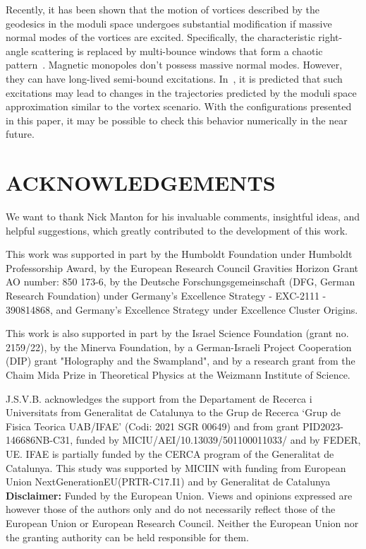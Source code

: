 \documentclass[aps, prd, twocolumn, superscriptaddress, preprintnumbers, nofootinbib, longbibliography]{revtex4-1}
\begin{document}
Recently, it has been shown that the motion of vortices described by the geodesics in the moduli space undergoes substantial modification if massive normal modes of the vortices are excited. Specifically, the characteristic right-angle scattering is replaced by multi-bounce windows that form a chaotic pattern~\cite{AlonsoIzquierdo:2024nbn, Krusch:2024vuy}.
Magnetic monopoles don't possess massive normal modes. However, they can have long-lived semi-bound excitations. In~\cite{GarciaMartin-Caro:2025zkc}, it is predicted that such excitations may lead to changes in the trajectories predicted by the moduli space approximation similar to the vortex scenario. With the configurations presented in this paper, it may be possible to check this behavior numerically in the near future.


\section*{\MakeUppercase{Acknowledgements}}
We want to thank Nick Manton for his invaluable comments, insightful ideas, and helpful suggestions, which greatly contributed to the development of this work.

This work was supported in part by the Humboldt Foundation under Humboldt Professorship Award, 
by the European Research Council Gravities Horizon Grant AO number: 850 173-6,  by the Deutsche Forschungsgemeinschaft (DFG, German Research Foundation) under Germany's Excellence Strategy - EXC-2111 - 390814868, and Germany's Excellence Strategy under Excellence Cluster Origins.

This work is also supported in part by the Israel Science Foundation (grant no. 2159/22), by the Minerva Foundation, by a German-Israeli Project Cooperation (DIP) grant "Holography and the Swampland", and by a research grant from the Chaim Mida Prize in Theoretical Physics at the Weizmann Institute of Science.

J.S.V.B. acknowledges the support from the Departament de Recerca i Universitats from Generalitat de Catalunya to the Grup de Recerca ‘Grup de Fisica Teorica UAB/IFAE’ (Codi: 2021 SGR 00649) and from grant PID2023-146686NB-C31, funded by MICIU/AEI/10.13039/501100011033/ and by FEDER, UE. IFAE is partially funded by the CERCA program of the Generalitat de Catalunya. This study was supported by MICIIN with funding from European Union NextGenerationEU(PRTR-C17.I1) and by Generalitat de Catalunya
\\[0.2cm]
\noindent\textbf{Disclaimer:}
Funded by the European Union. Views and opinions expressed are however those of the authors only and do not necessarily reflect those of the European Union or European Research Council. Neither the European Union nor the granting authority can be held responsible for them.
\end{document}
